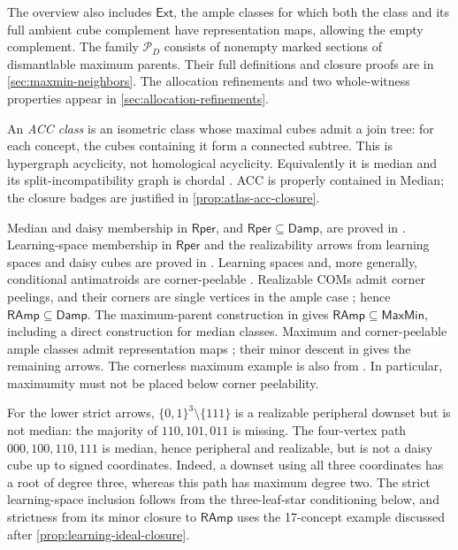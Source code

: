 \documentclass[11pt]{article}
\theoremstyle{definition}
\newcommand{\bits}{\{0,1\}}
\newcommand{\MaxMin}{\mathsf{MaxMin}}
\newcommand{\Damp}{\mathsf{Damp}}
\newcommand{\RAmp}{\mathsf{RAmp}}
\newcommand{\Rper}{\mathsf{Rper}}
\begin{document}
The overview also includes $\mathsf{Ext}$, the ample classes for which
both the class and its full ambient cube complement have representation
maps, allowing the empty complement. The family $\mathcal P_D$ consists
of nonempty marked sections of dismantlable maximum parents.
Their full definitions and closure proofs are in
\cref{sec:maxmin-neighbors}. The allocation refinements and two
whole-witness properties appear in \cref{sec:allocation-refinements}.

An \emph{ACC class} is an isometric class whose maximal cubes admit a
join tree: for each concept, the cubes containing it form a connected
subtree. This is hypergraph acyclicity, not homological acyclicity.
Equivalently it is median and its split-incompatibility graph is chordal
\cite[Theorem~\textnormal{ACC characterizations}]{Survey}.
ACC is properly contained in Median; the closure badges are justified in
\cref{prop:atlas-acc-closure}.



Median and daisy membership in $\Rper$, and $\Rper\subseteq\Damp$, are
proved in \cite{Cover}. Learning-space membership in $\Rper$ and the
realizability arrows from learning spaces and daisy cubes are proved in
\cite[Section~\textnormal{Downsets and learning spaces}]{MaxParents}.
Learning spaces and, more generally, conditional
antimatroids are corner-peelable \cite[Proposition~4.9]{CCMW}.
Realizable COMs admit corner peelings, and their corners are single vertices
in the ample case \cite[Propositions~5.3 and~5.5]{KM}; hence
$\RAmp\subseteq\Damp$. The maximum-parent construction in \cite{Geometry}
gives $\RAmp\subseteq\MaxMin$, including a direct construction for median
classes. Maximum and corner-peelable ample classes admit representation maps
\cite{CCMW}; their minor descent in \cite{Partition} gives the remaining
arrows. The cornerless maximum example is also from \cite[Theorem~4.5]{CCMW}.
In particular, maximumity must not be placed below corner peelability.

For the lower strict arrows, $\bits^3\setminus\{111\}$ is a realizable
peripheral downset but is not median: the majority of $110,101,011$ is
missing. The four-vertex path $000,100,110,111$ is median, hence peripheral
and realizable, but is not a daisy cube up to signed coordinates. Indeed,
a downset using all three coordinates has a root of degree three, whereas
this path has maximum degree two. The strict learning-space inclusion
follows from the three-leaf-star conditioning below, and strictness from
its minor closure to $\RAmp$ uses the 17-concept example discussed after
\cref{prop:learning-ideal-closure}.
\end{document}
